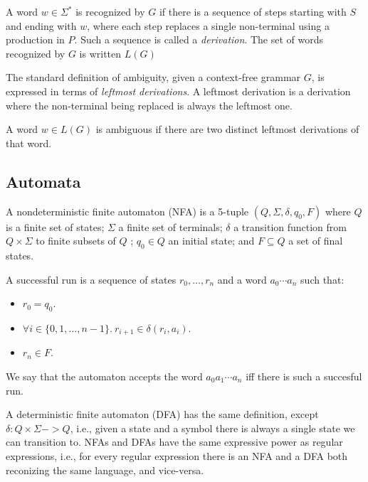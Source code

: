 \documentclass[runningheads]{llncs}
\newcommand{\T}{\Sigma} %
\begin{document}
%
A word $w \in \T^{*}$ is recognized by $G$ if there is a sequence of steps starting with $S$ and ending with $w$, where each step replaces a single non-terminal using a production in $P$. Such a sequence is called a \emph{derivation}. The set of words recognized by $G$ is written $L(G)$


The standard definition of ambiguity, given a context-free grammar $G$, is expressed in terms of \emph{leftmost derivations}. A leftmost derivation is a derivation where the non-terminal being replaced is always the leftmost one.

\begin{definition}
A word $w \in L(G)$ is ambiguous if there are two distinct leftmost derivations of that word.
\end{definition}

\subsection{Automata} \label{sec:preliminaries-automata}

A nondeterministic finite automaton (NFA) is a 5-tuple $(Q, \T, \delta, q_0, F)$ where $Q$ is a finite set of states; $\T$ a finite set of terminals; $\delta$ a transition function from $Q \times \T$ to finite subsets of $Q$ ; $q_0 \in Q$ an initial state; and $F \subseteq Q$ a set of final states.

A successful run is a sequence of states $r_0, \ldots, r_n$ and a word $a_0\cdots a_n$ such that:

\begin{itemize}
\item $r_0 = q_0$.
\item $\forall i \in \{0, 1, \ldots, n-1\}.\ r_{i+1} \in \delta(r_i, a_i)$.
\item $r_n \in F$.
\end{itemize}

\noindent We say that the automaton accepts the word $a_0a_1\cdots a_n$ iff there is such a succesful run.

A deterministic finite automaton (DFA) has the same definition, except $\delta : Q \times \Sigma -> Q$, i.e., given a state and a symbol there is always a single state we can transition to. NFAs and DFAs have the same expressive power as regular expressions, i.e., for every regular expression there is an NFA and a DFA both reconizing the same language, and vice-versa. %
\end{document}
